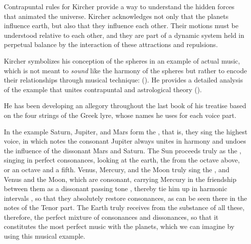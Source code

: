 
Contrapuntal rules for Kircher provide a way to understand the hidden forces
that animated the universe.%
    \Autocites
    {Gouk:Harmonics}
    {Gouk:MusicScienceMagic}
Kircher acknowledges not only that the planets influence earth, but also
that they influence each other.
Their motions must be understood relative to each other, and they are part of a
dynamic system held in perpetual balance by the interaction of these
attractions and repulsions.


Kircher symbolizes his conception of the spheres in an example of actual music,
which is not meant to \emph{sound} like the harmony of the spheres but rather to
encode their relationships through musical technique:
 ().%
    \Autocite[, 383]{Kircher:Musurgia}
He provides a detailed analysis of the example that unites contrapuntal and
astrological theory ().%
\begin{Footnote}
    He has been developing an allegory throughout the last book of his treatise
    based on the four strings of the Greek lyre, whose names he uses for each
    voice part.
\end{Footnote}
\begin{quoting}
	In the example Saturn, Jupiter, and Mars form the , that
	is, they sing the highest voice, in which notes the consonant Jupiter
	always unites in harmony  and undoes the influence of
	 the dissonant Mars and Saturn.
	The Sun proceeds truly as the  , singing in
	perfect consonances, looking at the earth, the 
	 from the octave above, or an octave and a fifth.
	Venus, Mercury, and the Moon truly sing the 
	, and Venus and the Moon, which are consonant, carrying
	Mercury in the friendship between them as a dissonant passing tone
	, thereby tie him up in harmonic
	intervals , so that they absolutely restore
	consonances, as can be seen there in the notes of the Tenor part.
	The Earth truly receives from the substance of all these, therefore,
	the perfect mixture of consonances and dissonances, so that it
        constitutes the most perfect music with the planets, which we can
        imagine by using this musical example.%
            \Autocite[, 383--384]{Kircher:Musurgia}
\end{quoting}
